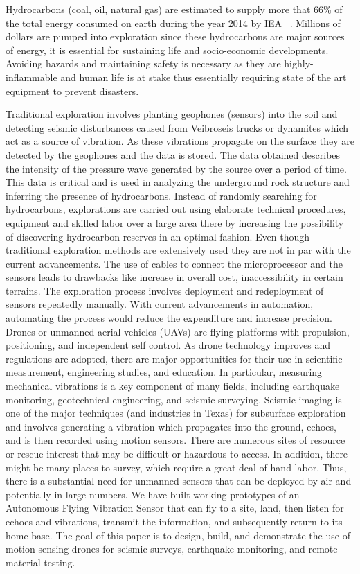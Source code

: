 Hydrocarbons (coal, oil, natural gas) are estimated to
supply more that 66\% of the total energy consumed on earth
during the year 2014 by IEA ~\cite{MVEwaWSN05}.
 Millions of dollars are pumped into exploration since these hydrocarbons are major sources of energy, it is essential for sustaining life and socio-economic developments. Avoiding hazards and maintaining safety is necessary as they are highly-inflammable and human life is at stake thus essentially requiring state of the art equipment to prevent disasters.

Traditional exploration involves planting geophones (sensors)
into the soil and detecting seismic disturbances caused
from Veibroseis trucks or dynamites which act as a source of
vibration. As these vibrations propagate on the surface they
are detected by the geophones and the data is stored. The
data obtained describes the intensity of the pressure wave
generated by the source over a period of time. This data
is critical and is used in analyzing the underground rock
structure and inferring the presence of hydrocarbons. Instead of randomly searching for hydrocarbons, explorations are carried out using elaborate technical procedures, equipment and skilled labor over a large area there by increasing the possibility of discovering hydrocarbon-reserves in an optimal fashion. 
Even though traditional exploration methods are extensively used they are not in par with the current advancements. The use of cables to connect the microprocessor and the sensors leads to drawbacks like increase in overall cost, inaccessibility in certain terrains. The exploration process involves deployment and redeployment of sensors repeatedly manually. With current advancements in automation, automating the process would reduce the expenditure and increase precision.
Drones or unmanned aerial vehicles (UAVs) are flying
platforms with propulsion, positioning, and independent self control.
As drone technology improves and regulations are
adopted, there are major opportunities for their use in scientific
measurement, engineering studies, and education. In particular,
measuring mechanical vibrations is a key component of many
fields, including earthquake monitoring, geotechnical engineering,
and seismic surveying. Seismic imaging is one of the
major techniques (and industries in Texas) for subsurface exploration
and involves generating a vibration which propagates
into the ground, echoes, and is then recorded using motion
sensors. There are numerous sites of resource or rescue interest
that may be difficult or hazardous to access. In addition, there
might be many places to survey, which require a great deal
of hand labor. Thus, there is a substantial need for unmanned
sensors that can be deployed by air and potentially in large
numbers. We have built working prototypes of an Autonomous
Flying Vibration Sensor that can fly to a site, land, then
listen for echoes and vibrations, transmit the information, and
subsequently return to its home base.
The goal of this paper is to design, build, and demonstrate
the use of motion sensing drones for seismic surveys, earthquake monitoring, and remote material testing. 

